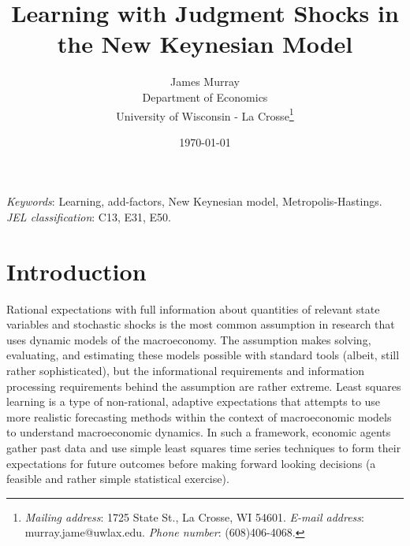 \documentclass[12pt]{article}
\begin{document}
\begin{titlepage}
\begin{singlespace}
\title{Learning with Judgment Shocks in the New Keynesian Model}
\date{\today}
\author{James Murray\\
Department of Economics\\
University of Wisconsin - La Crosse\footnote{\textit{Mailing address}: 1725 State St., La Crosse, WI  54601. \textit{E-mail address}: murray.jame@uwlax.edu.  \textit{Phone number}: (608)406-4068.}}

\maketitle

\thispagestyle{empty}

\newline  

\noindent \textit{Keywords}: Learning, add-factors, New Keynesian model, Metropolis-Hastings. \\
\noindent \textit{JEL classification}: C13, E31, E50.
\end{singlespace}
\end{titlepage}

\newpage

\section{Introduction}

Rational expectations with full information about quantities of relevant state variables and stochastic shocks is the most common assumption in research that uses dynamic models of the macroeconomy.  The assumption makes solving, evaluating, and estimating these models possible with standard tools (albeit, still rather sophisticated), but the informational requirements and information processing requirements behind the assumption are rather extreme.  Least squares learning is a type of non-rational, adaptive expectations that attempts to use more realistic forecasting methods within the context of macroeconomic models to understand macroeconomic dynamics.  In such a framework, economic agents gather past data and use simple least squares time series techniques to form their expectations for future outcomes before making forward looking decisions (a feasible and rather simple statistical exercise). 
\end{document}
